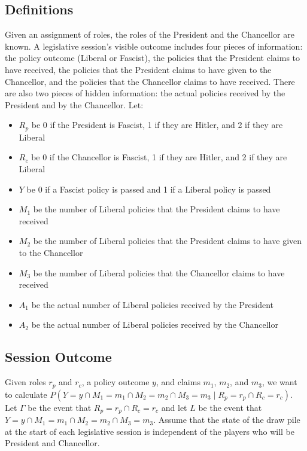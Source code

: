 \documentclass[fleqn, 12pt, letterpaper]{article}
\begin{document}
\subsection{Definitions}
Given an assignment of roles, the roles of the President and the Chancellor are known. A legislative session's visible outcome includes four pieces of information: the policy outcome (Liberal or Fascist), the policies that the President claims to have received, the policies that the President claims to have given to the Chancellor, and the policies that the Chancellor claims to have received. There are also two pieces of hidden information: the actual policies received by the President and by the Chancellor. Let:
\begin{itemize}
	\item $R_p$ be 0 if the President is Fascist, 1 if they are Hitler, and 2 if they are Liberal
	\item $R_c$ be 0 if the Chancellor is Fascist, 1 if they are Hitler, and 2 if they are Liberal
	\item $Y$ be 0 if a Fascist policy is passed and 1 if a Liberal policy is passed
	\item $M_1$ be the number of Liberal policies that the President claims to have received
	\item $M_2$ be the number of Liberal policies that the President claims to have given to the Chancellor
	\item $M_3$ be the number of Liberal policies that the Chancellor claims to have received
	\item $A_1$ be the actual number of Liberal policies received by the President
	\item $A_2$ be the actual number of Liberal policies received by the Chancellor
\end{itemize}

\subsection{Session Outcome}
Given roles $r_p$ and $r_c$, a policy outcome $y$, and claims $m_1$, $m_2$, and $m_3$, we want to calculate $P(Y=y \cap M_1=m_1 \cap M_2=m_2 \cap M_3=m_3 \mid R_p=r_p \cap R_c=r_c)$. Let $\Gamma$ be the event that $R_p=r_p \cap R_c=r_c$ and let $L$ be the event that $Y=y \cap M_1=m_1 \cap M_2=m_2 \cap M_3=m_3$. Assume that the state of the draw pile at the start of each legislative session is independent of the players who will be President and Chancellor.
\end{document}
